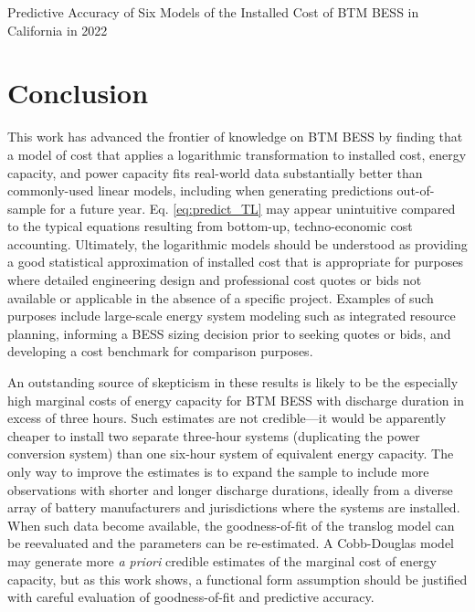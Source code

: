 \documentclass[preprint,12pt,authoryear]{elsarticle}
\begin{document}
\begin{landscape}

\begin{table}
\centering

\caption{Predictive Accuracy of Six Models of the Installed Cost of BTM BESS in California in 2022}\label{tab:model_validation}
\label{tab:model_calibration}
\end{table}

\end{landscape}

\section{Conclusion}\label{sec:conclusion}

This work has advanced the frontier of knowledge on BTM BESS by finding that a model of cost that applies a logarithmic transformation to installed cost, energy capacity, and power capacity fits real-world data substantially better than commonly-used linear models, including when generating predictions out-of-sample for a future year. Eq. \ref{eq:predict_TL} may appear unintuitive compared to the typical equations resulting from bottom-up, techno-economic cost accounting. Ultimately, the logarithmic models should be understood as providing a good statistical approximation of installed cost that is appropriate for purposes where detailed engineering design and professional cost quotes or bids not available or applicable in the absence of a specific project. Examples of such purposes include large-scale energy system modeling such as integrated resource planning, informing a BESS sizing decision prior to seeking quotes or bids, and developing a cost benchmark for comparison purposes.

An outstanding source of skepticism in these results is likely to be the especially high marginal costs of energy capacity for BTM BESS with discharge duration in excess of three hours. Such estimates are not credible---it would be apparently cheaper to install two separate three-hour systems (duplicating the power conversion system) than one six-hour system of equivalent energy capacity. The only way to improve the estimates is to expand the sample to include more observations with shorter and longer discharge durations, ideally from a diverse array of battery manufacturers and jurisdictions where the systems are installed. When such data become available, the goodness-of-fit of the translog model can be reevaluated and the parameters can be re-estimated. A Cobb-Douglas model may generate more \textit{a priori} credible estimates of the marginal cost of energy capacity, but as this work shows, a functional form assumption should be justified with careful evaluation of goodness-of-fit and predictive accuracy.
\end{document}
